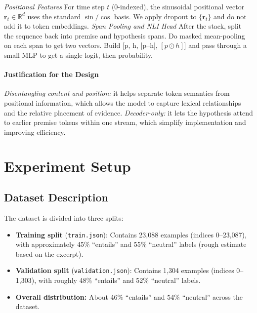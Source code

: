 \documentclass[11pt]{article}
\begin{document}
\emph{Positional Features}
For time step $t$ (0-indexed), the sinusoidal positional vector $\mathbf{r}_t \in \mathbb{R}^{d}$ uses the standard $\sin/\cos$ basis. We apply dropout to $\{\mathbf{r}_t\}$ and do not add it to token embeddings.
\emph{Span Pooling and NLI Head}
After the stack, split the sequence back into premise and hypothesis spans. Do masked mean-pooling on each span to get two vectors.
Build [p, h, |p–h|, $[p\odot h]$] and pass through a small MLP to get a single logit, then probability.

\paragraph{Justification for the Design}
\emph{Disentangling content and position:} it helps separate token semantics from positional information, which allows the model to capture lexical relationships and the relative placement of evidence.
\emph{Decoder-only:} it lets the hypothesis attend to earlier premise tokens within one stream, which simplify implementation and improving efficiency.

\section{Experiment Setup}
\subsection{Dataset Description}
\noindent The dataset is divided into three splits:
\begin{itemize}[leftmargin=1em, itemsep=0pt, topsep=0pt]
    \item \textbf{Training split} (\texttt{train.json}): Contains 23,088 examples (indices 0--23,087), with approximately 45\% ``entails'' and 55\% ``neutral'' labels (rough estimate based on the excerpt).
    \item \textbf{Validation split} (\texttt{validation.json}): Contains 1,304 examples (indices 0--1,303), with roughly 48\% ``entails'' and 52\% ``neutral'' labels.
    \item \textbf{Overall distribution:} About 46\% ``entails'' and 54\% ``neutral'' across the dataset.
\end{itemize}
\end{document}
